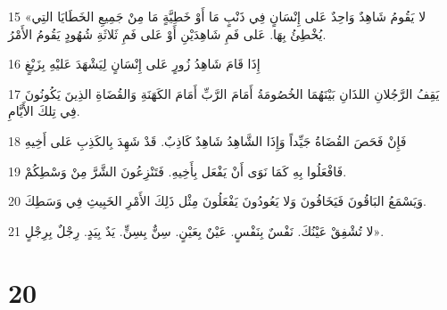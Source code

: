\par 15 «لا يَقُومُ شَاهِدٌ وَاحِدٌ عَلى إِنْسَانٍ فِي ذَنْبٍ مَا أَوْ خَطِيَّةٍ مَا مِنْ جَمِيعِ الخَطَايَا التِي يُخْطِئُ بِهَا. عَلى فَمِ شَاهِدَيْنِ أَوْ عَلى فَمِ ثَلاثَةِ شُهُودٍ يَقُومُ الأَمْرُ.
\par 16 إِذَا قَامَ شَاهِدُ زُورٍ عَلى إِنْسَانٍ لِيَشْهَدَ عَليْهِ بِزَيْغٍ
\par 17 يَقِفُ الرَّجُلانِ اللذَانِ بَيْنَهُمَا الخُصُومَةُ أَمَامَ الرَّبِّ أَمَامَ الكَهَنَةِ وَالقُضَاةِ الذِينَ يَكُونُونَ فِي تِلكَ الأَيَّامِ.
\par 18 فَإِنْ فَحَصَ القُضَاةُ جَيِّداً وَإِذَا الشَّاهِدُ شَاهِدٌ كَاذِبٌ. قَدْ شَهِدَ بِالكَذِبِ عَلى أَخِيهِ
\par 19 فَافْعَلُوا بِهِ كَمَا نَوَى أَنْ يَفْعَل بِأَخِيهِ. فَتَنْزِعُونَ الشَّرَّ مِنْ وَسْطِكُمْ.
\par 20 وَيَسْمَعُ البَاقُونَ فَيَخَافُونَ وَلا يَعُودُونَ يَفْعَلُونَ مِثْل ذَلِكَ الأَمْرِ الخَبِيثِ فِي وَسَطِكَ.
\par 21 لا تُشْفِقْ عَيْنُكَ. نَفْسٌ بِنَفْسٍ. عَيْنٌ بِعَيْنٍ. سِنٌّ بِسِنٍّ. يَدٌ بِيَدٍ. رِجْلٌ بِرِجْلٍ».

\chapter{20}

